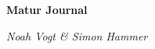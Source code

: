 \thispagestyle{empty}

\begin{center}
	\vfill
    \vspace*{0.4\textheight}

	\Huge
	\bf{Matur Journal}
    
	\Large
	\it{Noah Vogt \& Simon Hammer}
	
    \normalsize
    
 \end{center}
